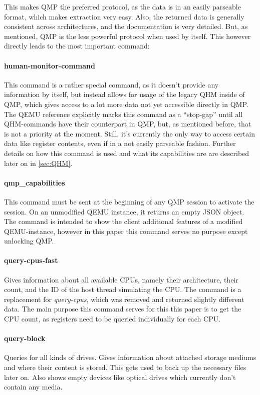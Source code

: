 This makes QMP the preferred protocol, as the data is in an easily parseable format, which makes extraction very easy.
Also, the returned data is generally consistent across architectures, and the documentation is very detailed.
But, as mentioned, QMP is the less powerful protocol when used by itself.
This however directly leads to the most important command\cite{qmp-commands}:

\paragraph{human-monitor-command}
This command is a rather special command, as it doesn't provide any information by itself,
but instead allows for usage of the legacy QHM inside of QMP,
which gives access to a lot more data not yet accessible directly in QMP.
The QEMU reference explicitly marks this command as a \enquote{stop-gap} until all QHM-commands have their counterpart in QMP,
but, as mentioned before, that is not a priority at the moment.
Still, it's currently the only way to access certain data like register contents, even if in a not easily parseable fashion.
Further details on how this command is used and what its capabilities are are described later on in \autoref{sec:QHM}.

\paragraph{qmp\_capabilities}
This command must be sent at the beginning of any QMP session to activate the session.
On an unmodified QEMU instance, it returns an empty JSON object.
The command is intended to show the client additional features of a modified QEMU-instance,
however in this paper this command serves no purpose except unlocking QMP.

\paragraph{query-cpus-fast}
Gives information about all available CPUs, namely their architecture,
their count, and the ID of the host thread simulating the CPU.
The command is a replacement for \emph{query-cpus}, which was removed and returned slightly different data.
The main purpose this command serves for this this paper is to get the CPU count,
as registers need to be queried individually for each CPU.

\paragraph{query-block}
Queries for all kinds of drives. Gives information about attached storage mediums and where their content is stored.
This gets used to back up the necessary files later on.
Also shows empty devices like optical drives which currently don't contain any media.

